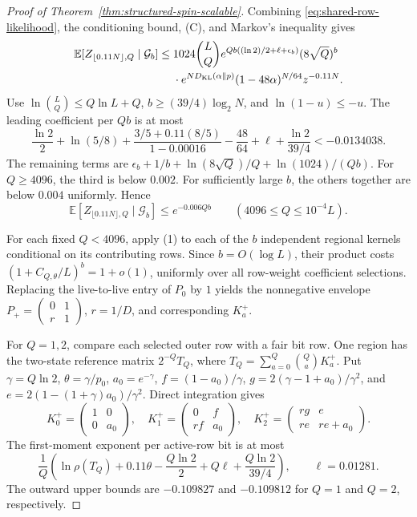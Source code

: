 \begin{proof}[Proof of Theorem~\ref{thm:structured-spin-scalable}]
Combining \eqref{eq:shared-row-likelihood}, the conditioning bound,
(C), and Markov's inequality gives
\begin{align}
 \mathbb E[Z_{\lfloor0.11N\rfloor,Q}\mid\mathcal G_b]
 \le{}&1024\binom LQ
 e^{Qb((\ln2)/2+\ell+\epsilon_b)}(8\sqrt Q)^b
 \nonumber\\
 &\cdot e^{ND_{\rm KL}(\alpha\Vert p)}
 (1-48\alpha)^{N/64}z^{-0.11N}.
 \label{eq:shared-uniform-sparse}
\end{align}
Use $\ln\binom LQ\le Q\ln L+Q$,
$b\ge(39/4)\log_2N$, and $\ln(1-u)\le-u$.
The leading coefficient per $Qb$ is at most
\[
 \frac{\ln2}{2}+\ln(5/8)
 +\frac{3/5+0.11(8/5)}{1-0.00016}-\frac{48}{64}
 +\ell+\frac{\ln2}{39/4}<-0.0134038.
\]
The remaining terms are
$\epsilon_b+1/b+\ln(8\sqrt Q)/Q+\ln(1024)/(Qb)$.
For $Q\ge4096$, the third is below $0.002$. For sufficiently large
$b$, the others together are below $0.004$ uniformly. Hence
\[
 \mathbb E[Z_{\lfloor0.11N\rfloor,Q}\mid\mathcal G_b]
 \le e^{-0.006Qb}
 \qquad(4096\le Q\le10^{-4}L).
 \tag{D}
\]

For each fixed $Q<4096$, apply (1) to each of the $b$ independent
regional kernels conditional on its contributing rows. Since
$b=O(\log L)$, their product costs
$(1+C_{Q,\theta}/L)^b=1+o(1)$, uniformly over all row-weight
coefficient selections. Replacing the live-to-live entry of $P_0$ by
$1$ yields the nonnegative envelope
$P_+=\left(\begin{smallmatrix}0&1\\r&1\end{smallmatrix}\right)$,
$r=1/D$, and corresponding $K_a^+$.

For $Q=1,2$, compare each selected outer row with a fair bit row.
One region has the two-state reference matrix $2^{-Q}T_Q$, where
$T_Q=\sum_{a=0}^Q\binom Qa K_a^+$. Put
$\gamma=Q\ln2$, $\theta=\gamma/p_0$,
$a_0=e^{-\gamma}$,
$f=(1-a_0)/\gamma$,
$g=2(\gamma-1+a_0)/\gamma^2$, and
$e=2(1-(1+\gamma)a_0)/\gamma^2$. Direct integration gives
\[
 K_0^+=\begin{pmatrix}1&0\\0&a_0\end{pmatrix},\quad
 K_1^+=\begin{pmatrix}0&f\\rf&a_0\end{pmatrix},\quad
 K_2^+=\begin{pmatrix}rg&e\\re&re+a_0\end{pmatrix}.
\]
The first-moment exponent per active-row bit is at most
\[
 \frac1Q\left(\ln\rho(T_Q)+0.11\theta
 -\frac{Q\ln2}{2}+Q\ell+\frac{Q\ln2}{39/4}\right),
 \qquad \ell=0.01281.
\]
The outward upper bounds are $-0.109827$ and $-0.109812$ for
$Q=1$ and $Q=2$, respectively.


\end{proof}
